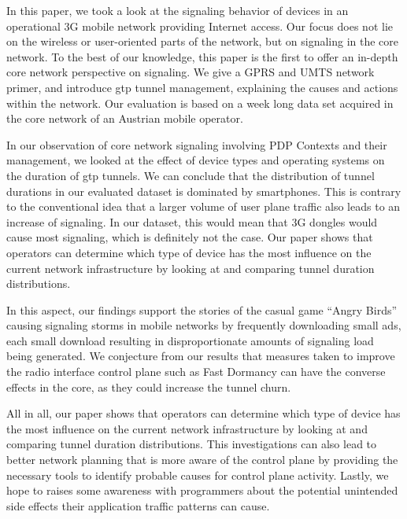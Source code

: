 In this paper, we took a look at the signaling behavior of devices in an operational \gls{3G} mobile network providing Internet access. Our focus does not lie on the wireless or user-oriented parts of the network, but on signaling in the core network. To the best of our knowledge, this paper is the first to offer an in-depth core network perspective on signaling. We give a \gls{GPRS} and \gls{UMTS} network primer, and introduce \gls{gtp} tunnel management, explaining the causes and actions within the network. Our evaluation is based on a week long data set acquired in the core network of an Austrian mobile operator.



In our observation of core network signaling involving \gls{PDP} Contexts and their management, we looked at the effect of device types and operating systems on the duration of \gls{gtp} tunnels. We can conclude that the distribution of tunnel durations in our evaluated dataset is dominated by smartphones. This is contrary to the conventional idea that a larger volume of user plane traffic also leads to an increase of signaling. In our dataset, this would mean that 3G dongles would cause most signaling, which is definitely not the case. Our paper shows that operators can determine which type of device has the most influence on the current network infrastructure by looking at and comparing tunnel duration distributions.

In this aspect, our findings support the stories of the casual game ``Angry Birds'' causing signaling storms in mobile networks by frequently downloading small ads, each small download resulting in disproportionate amounts of signaling load being generated. We conjecture from our results that measures taken to improve the radio interface control plane such as Fast Dormancy can have the converse effects in the core, as they could increase the tunnel churn.


All in all, our paper shows that operators can determine which type of device has the most influence on the current network infrastructure by looking at and comparing tunnel duration distributions. %
This investigations can also lead to better network planning that is more aware of the control plane by providing the necessary tools to identify probable causes for control plane activity. Lastly, we hope to raises some awareness with programmers about the potential unintended side effects their application traffic patterns can cause.

